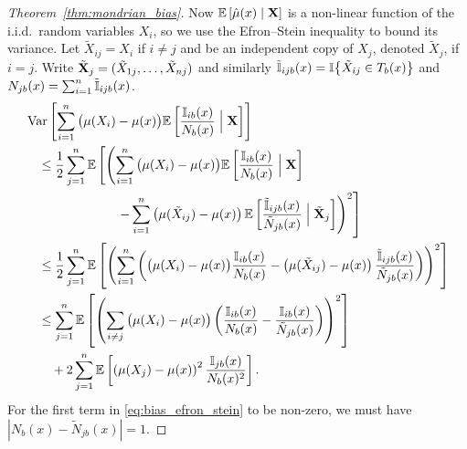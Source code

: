\begin{proof}[Theorem~\ref{thm:mondrian_bias}]

  Now $\mathbb{E} \left[ \hat\mu(x) \mid \mathbf{X} \right]$
  is a non-linear function of the i.i.d.\ random variables $X_i$,
  so we use the Efron--Stein inequality
  \citep{efron1981jackknife} to bound its variance.
  Let $\tilde X_{i j} = X_i$ if $i \neq j$ and be an
  independent copy of $X_j$, denoted $\tilde X_j$, if $i = j$.
  Write $\tilde {\mathbf{X}}_j = (\tilde X_{1j}, \ldots, \tilde X_{n j})$
  and similarly
  $\tilde {\mathbb{I}}_{i j b}(x) = \mathbb{I} \big\{ \tilde X_{i j} \in T_b(x) \big\}$
  and $N_{j b}(x) = \sum_{i=1}^{n} \tilde {\mathbb{I}}_{i j b}(x)$.
  \begin{align}
    \nonumber
    &\operatorname{Var} \left[
      \sum_{i=1}^{n}
      \big( \mu(X_i) - \mu(x) \big)
      \mathbb{E} \left[
        \frac{\mathbb{I}_{i b}(x)}{N_b(x)}
        \Bigm| \mathbf{X}
      \right]
    \right] \\
    \nonumber
    &\quad\leq
    \frac{1}{2}
    \sum_{j=1}^{n}
    \mathbb{E} \left[
      \left(
        \sum_{i=1}^{n}
        \big( \mu(X_i) - \mu(x) \big)
        \mathbb{E} \left[
          \frac{\mathbb{I}_{i b}(x)}{N_b(x)}
          \Bigm| \mathbf{X}
        \right]
        \right.\right. \\
        \nonumber
        &\qquad\qquad\qquad\quad\left.\left.
        - \sum_{i=1}^{n}
        \left( \mu(\tilde X_{i j}) - \mu(x) \right)
        \mathbb{E} \left[
          \frac{\tilde {\mathbb{I}}_{i j b}(x)}{\tilde N_{j b}(x)}
          \Bigm| \tilde {\mathbf{X}}_j
        \right]
      \right)^2
    \right] \\
    \nonumber
    &\quad\leq
    \frac{1}{2}
    \sum_{j=1}^{n}
    \mathbb{E} \left[
      \left(
        \sum_{i=1}^{n}
        \left(
          \big( \mu(X_i) - \mu(x) \big)
          \frac{\mathbb{I}_{i b}(x)}{N_b(x)}
          - \left( \mu(\tilde X_{i j}) - \mu(x) \right)
          \frac{\tilde {\mathbb{I}}_{i j b}(x)}{\tilde N_{j b}(x)}
        \right)
      \right)^2
    \right] \\
    \nonumber
    &\quad\leq
    \sum_{j=1}^{n}
    \mathbb{E} \left[
      \left(
        \sum_{i \neq j}
        \big( \mu(X_i) - \mu(x) \big)
        \left(
          \frac{\mathbb{I}_{i b}(x)}{N_b(x)} - \frac{\mathbb{I}_{i b}(x)}{\tilde N_{j b}(x)}
        \right)
      \right)^2
    \right] \\
    \label{eq:bias_efron_stein}
    &\qquad+
    2 \sum_{j=1}^{n}
    \mathbb{E} \left[
      \left( \mu(X_j) - \mu(x) \right)^2
      \frac{\mathbb{I}_{j b}(x)}{N_b(x)^2}
    \right].
  \end{align}
  For the first term in \eqref{eq:bias_efron_stein} to be non-zero,
  we must have $|N_b(x) - \tilde N_{j b}(x)| = 1$.

\end{proof}
